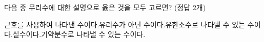 다음 중 무리수에 대한 설명으로 옳은 것을 모두 고르면? (정답 2개)
\begin{choicesv}{근호를 사용하여 나타낸 수이다.}{유리수가 아닌 수이다.}{유한소수로 나타낼 수 있는 수이다.}{실수이다.}{기약분수로 나타낼 수 있는 수이다.}\end{choicesv}
